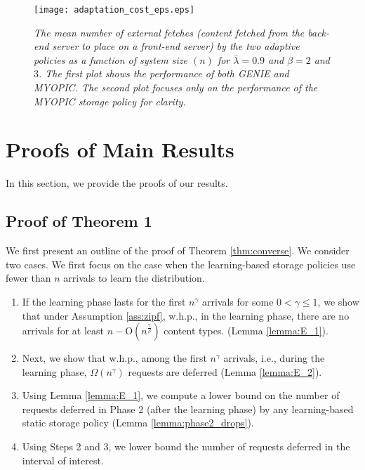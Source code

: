 \documentclass[10pt, conference, letterpaper]{IEEEtran}
\def \OO {\mathrm{O}}
\begin{document}
\begin{figure}[h]
	\begin{center}
		\texttt{[image: adaptation\_cost\_eps.eps]}
		\caption{\sl The mean number of external fetches (content fetched from the back-end server to place on a front-end server) by the two adaptive policies as a function of system size $(n)$ for $\bar{\lambda} = 0.9$ and $\beta = 2$ and $3$. The first plot shows the performance of both GENIE and MYOPIC. The second plot focuses only on the performance of the MYOPIC storage policy for clarity. \label{fig:adaptation_cost}}
	\end{center}
\end{figure}












\section{Proofs of Main Results}
\label{proofs}
In this section, we provide the proofs of our results. 
\subsection{Proof of Theorem 1}
\label{sec:proof2}

\noindent We first present an outline of the proof of Theorem \ref{thm:converse}. We consider two cases. We first focus on the case when the learning-based storage policies use fewer than $n$ arrivals to learn the distribution.
\begin{enumerate}
	\item If the learning phase lasts for the first $n^{\gamma}$ arrivals for some $0<\gamma \leq 1$, we show that under Assumption \ref{ass:zipf}, w.h.p., in the learning phase, there are no arrivals for at least $n - \OO(n^{\frac{\gamma}{\beta}})$ content types. (Lemma \ref{lemma:E_1}).
	\item Next, we show that w.h.p., among the first $n^{\gamma}$ arrivals, i.e., during the learning phase, $\Omega(n^{\gamma})$ requests are deferred (Lemma \ref{lemma:E_2}).
	\item Using Lemma \ref{lemma:E_1}, we compute a lower bound on the number of requests deferred in Phase 2 (after the learning phase) by any learning-based static storage policy (Lemma \ref{lemma:phase2_drops}).
	\item Using Steps 2 and 3, we lower bound the number of requests deferred in the interval of interest.
\end{enumerate}
\end{document}
